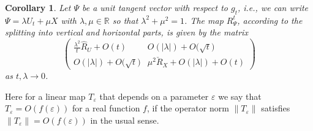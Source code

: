 \documentclass[11pt]{article}
\numberwithin{equation}{section}
\numberwithin{equation}{section}
\newtheorem{Corollary}[Theorem]{Corollary}
\begin{document}
\begin{Corollary}\label{R_matrix}
	Let $\Psi$ be a unit tangent vector with respect to $g_t$, i.e., we can write $\Psi=\lambda U_t+\mu X$ with $\lambda,\mu\in\mathbb{R}$ so that $\lambda^2+\mu^2=1$. The map $R_\Psi^t$, according to the splitting into vertical and horizontal parts, is given by the matrix
	\begin{equation*}
	\begin{pmatrix}
		\frac{\lambda^2}{t}\hat{R}_U+O(t) & O(|\lambda|)+O\bigl(\sqrt{t}\bigr)\\
		O(|\lambda|)+O\bigl(\sqrt{t}\bigr) & \mu^2 \check{R}_X+O(|\lambda|)+O(t)
	\end{pmatrix}
\end{equation*}
	as $t,\lambda\to0$.
\end{Corollary}
Here for a linear map $T_\varepsilon$ that depends on a parameter $\varepsilon$ we say that $T_\varepsilon=O(f(\varepsilon))$ for a real function $f$, if the operator norm $\lVert T_\varepsilon\rVert$ satisfies $\lVert T_\varepsilon\rVert=O(f(\varepsilon))$ in the usual sense.
\end{document}
